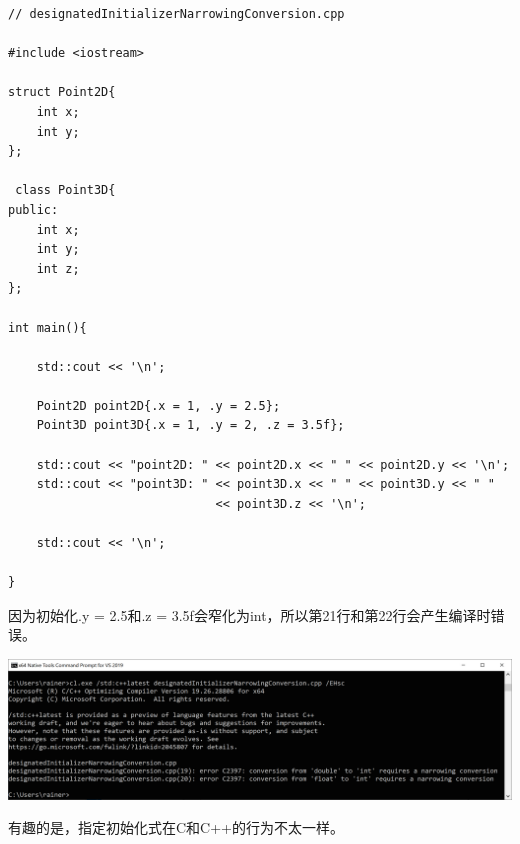 \begin{lstlisting}[style=styleCXX]
// designatedInitializerNarrowingConversion.cpp

#include <iostream>

struct Point2D{
	int x;
	int y;
};

 class Point3D{
public:
	int x;
	int y;
	int z;
};

int main(){
	
	std::cout << '\n';
	
	Point2D point2D{.x = 1, .y = 2.5};
	Point3D point3D{.x = 1, .y = 2, .z = 3.5f};
	
	std::cout << "point2D: " << point2D.x << " " << point2D.y << '\n';
	std::cout << "point3D: " << point3D.x << " " << point3D.y << " "
							 << point3D.z << '\n';
	
	std::cout << '\n';

}
\end{lstlisting}

因为初始化.y = 2.5和.z = 3.5f会窄化为int，所以第21行和第22行会产生编译时错误。

\begin{center}
\includegraphics[width=1.0\textwidth]{content/3/chapter4/images/35.png}\\
\end{center}

有趣的是，指定初始化式在C和C++的行为不太一样。

